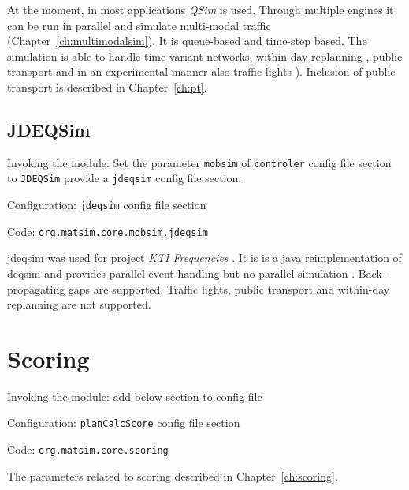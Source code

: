 At the moment, in most applications \emph{QSim} \citep[][]{Dobler_TechRep_IVT_2011, Dobler_STRC_2010} is used. 
Through multiple engines it can be run in parallel and simulate multi-modal traffic (Chapter~\ref{ch:multimodalsim}). It is queue-based and time-step based. The simulation is able to handle time-variant networks, within-day replanning \citep[][]{Dobler_TechRep_IVT_2009}, public transport \citep[][]{Rieser_PhDThesis_2010} and in an experimental manner also traffic lights \citep[][]{Neumann_MastersThesis_2008}). Inclusion of public transport is described in Chapter~\ref{ch:pt}.

\subsection{JDEQSim}
\label{sec:jdeqsim}
\begin{compactitem}
\item Invoking the module: Set the parameter \lstinline|mobsim| of \lstinline|controler| config file section to \lstinline|JDEQSim| provide a \lstinline|jdeqsim| config file section.
\item Configuration: \lstinline|jdeqsim| config file section
\item Code: \lstinline|org.matsim.core.mobsim.jdeqsim|
\end{compactitem}

\gls{jdeqsim} \citep[][]{WaraichEtAl_TechRep_IVT_2009, WaraichEtAl_STRC_2009} was used for project \emph{KTI Frequencies} \citep[][]{BalmerEtAl_ResRep_datapuls_2010}. It is is a \gls{java} reimplementation of \gls{deqsim} \citep[][]{WaraichEtAl_STRC_2009, CharyparEtAl_TRR_2007, CharyparEtAl_TRB_2009} and provides parallel event handling but no parallel simulation \citep[][p.11]{BalmerEtAl_ResRep_datapuls_2010}. Back-propagating gaps are supported. Traffic lights, public transport and within-day replanning are not supported.

\section{Scoring}
\label{sec:scoring}
\begin{compactitem}
\item Invoking the module: add below section to config file
\item Configuration: \lstinline|planCalcScore| config file section
\item Code: \lstinline|org.matsim.core.scoring|
\end{compactitem}
%
The parameters related to scoring described in Chapter~\ref{ch:scoring}.


